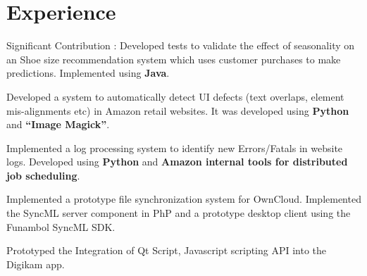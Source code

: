 \documentclass[]{deedy-resume}
\begin{document}
\hfill
\begin{minipage}[t]{0.66\textwidth} 


\section{Experience}
\vspace{\topsep} %
\begin{tightemize}
\item Significant Contribution : Developed tests to validate the effect of seasonality on an Shoe size recommendation system which uses customer purchases to make predictions. Implemented using \textbf{Java}.
\end{tightemize}
\sectionsep

\begin{tightemize}
\item Developed a system to automatically detect UI defects (text overlaps, element mis-alignments etc) in Amazon retail websites. It was developed using \textbf{Python} and \textbf{“Image Magick”}.
\item Implemented a log processing system to identify new Errors/Fatals in website logs. Developed using \textbf{Python} and \textbf{Amazon internal tools for distributed job scheduling}.
\end{tightemize}
\sectionsep

\begin{tightemize}
\item Implemented a prototype file synchronization system for OwnCloud. Implemented the SyncML server component in PhP and a prototype desktop client using the Funambol SyncML SDK.
\end{tightemize}
\sectionsep

\begin{tightemize}
\item Prototyped the Integration of Qt Script, Javascript scripting API into the Digikam app.
\end{tightemize}
\sectionsep



\end{minipage}
\end{document}
